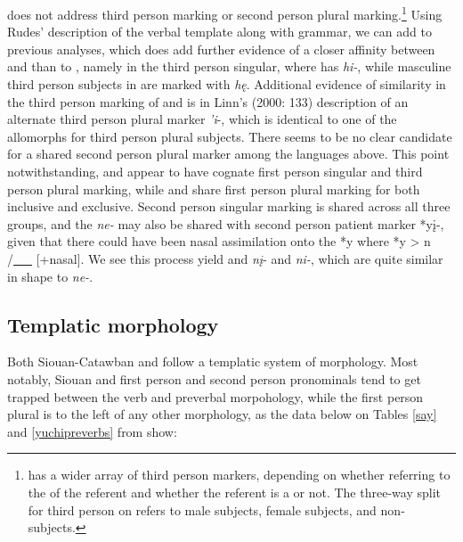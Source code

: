 \documentclass[output=paper]{LSP/langsci}
\begin{document}
\citet{Rankin1998scy} does not address third person marking or second person plural marking.\footnote{ has a wider array of third person markers, depending on whether referring to the  of the referent and whether the referent is a  or not. The three-way split for third person on  refers to male  subjects, female  subjects, and non- subjects.} Using Rudes' \citeyear{Rudes2007} description of the  verbal template along with   grammar, we can add to previous analyses, which does add further evidence of a closer affinity between  and  than to , namely in the third person singular, where  has \emph{hi-}, while masculine third person subjects in  are marked with \emph{h\k{e}}. Additional evidence of similarity in the third person marking of  and  is in Linn's (2000: 133) description of an alternate third person plural marker \emph{'i}-, which is identical to one of the  allomorphs for third person plural subjects. There seems to be no clear candidate for a shared second person plural marker among the languages above. This point notwithstanding,  and  appear to have cognate first person singular and third person plural marking, while  and  share first person plural marking for both inclusive and exclusive. Second person singular marking is shared across all three groups, and the  \emph{ne-} may also be shared with  second person patient marker *y\k{i}-, given that there could have been nasal assimilation onto the *y where *y > n /\underline{~~~} [+nasal]. We see this process yield  and  \emph{n\k{i}}- and  \emph{ni-}, which are quite similar in shape to  \emph{ne-}.

\subsection{Templatic morphology}

Both Siouan-Catawban and  follow a templatic system of morphology. Most notably, Siouan and  first person and second person pronominals tend to get trapped between the verb and preverbal morpohology, while the first person plural is to the left of any other morphology, as the data below on Tables \ref{say} and \ref{yuchipreverbs} from \citet{Rankin1998scy} show:
\end{document}
